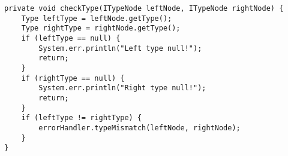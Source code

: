 \begin{lstlisting}[caption={checkType function}, label={code:TC:checkType}]
private void checkType(ITypeNode leftNode, ITypeNode rightNode) {
    Type leftType = leftNode.getType();
    Type rightType = rightNode.getType();
    if (leftType == null) {
        System.err.println("Left type null!");
        return;
    }
    if (rightType == null) {
        System.err.println("Right type null!");
        return;
    }
    if (leftType != rightType) {
        errorHandler.typeMismatch(leftNode, rightNode);
    }
}
\end{lstlisting}